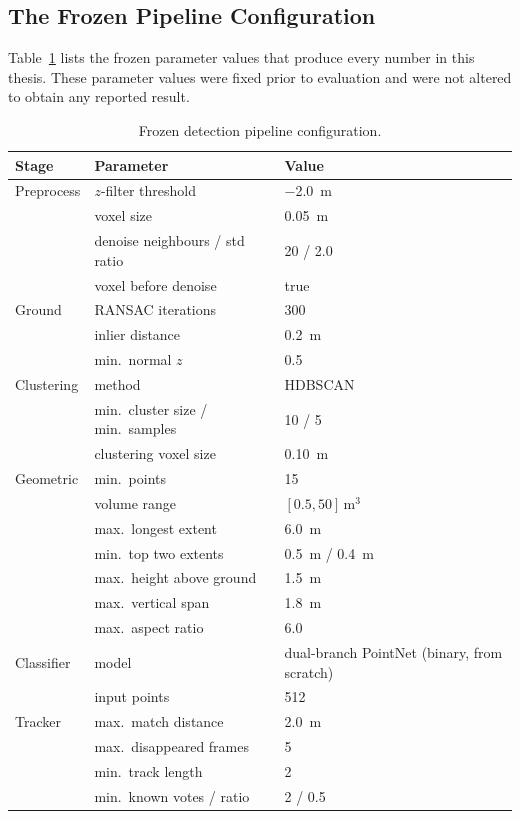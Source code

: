 \subsection{The Frozen Pipeline Configuration}
\label{sec:pipeline-config}

Table~\ref{tab:pipeline-config} lists the frozen parameter values that produce
every number in this thesis. These parameter values were fixed prior to evaluation and
were not altered to obtain any reported result.

\begin{table}[H]
  \centering
  \caption[Frozen detection pipeline configuration]{Frozen detection pipeline configuration.}
  \label{tab:pipeline-config}
  \small
  \begin{tabular}{lll}
    \toprule
    Stage & Parameter & Value \\
    \midrule
    Preprocess & $z$-filter threshold & \SI{-2.0}{\meter} \\
               & voxel size & \SI{0.05}{\meter} \\
               & denoise neighbours / std ratio & \num{20} / \num{2.0} \\
               & voxel before denoise & true \\
    \midrule
    Ground     & RANSAC iterations & \num{300} \\
               & inlier distance & \SI{0.2}{\meter} \\
               & min.\ normal $z$ & \num{0.5} \\
    \midrule
    Clustering & method & HDBSCAN \\
               & min.\ cluster size / min.\ samples & \num{10} / \num{5} \\
               & clustering voxel size & \SI{0.10}{\meter} \\
    \midrule
    Geometric  & min.\ points & \num{15} \\
               & volume range & $[\num{0.5}, \num{50}]\,\si{\meter\cubed}$ \\
               & max.\ longest extent & \SI{6.0}{\meter} \\
               & min.\ top two extents & \SI{0.5}{\meter} / \SI{0.4}{\meter} \\
               & max.\ height above ground & \SI{1.5}{\meter} \\
               & max.\ vertical span & \SI{1.8}{\meter} \\
               & max.\ aspect ratio & \num{6.0} \\
    \midrule
    Classifier & model & dual-branch PointNet (binary, from scratch) \\
               & input points & \num{512} \\
    \midrule
    Tracker    & max.\ match distance & \SI{2.0}{\meter} \\
               & max.\ disappeared frames & \num{5} \\
               & min.\ track length & \num{2} \\
               & min.\ known votes / ratio & \num{2} / \num{0.5} \\
    \bottomrule
  \end{tabular}
\end{table}

